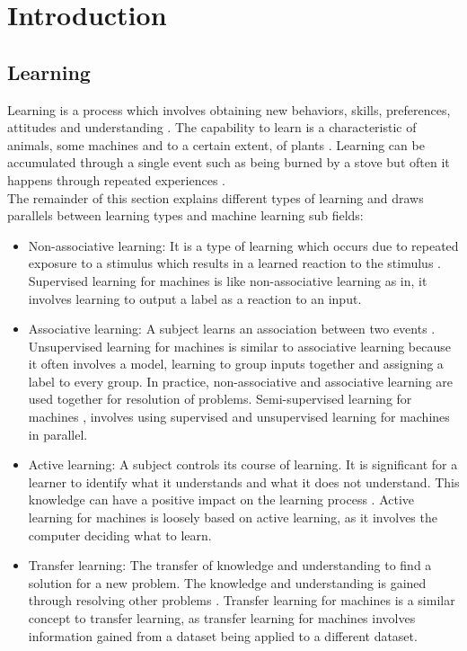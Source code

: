 
\chapter{Introduction}\label{chapter:introduction}

\section{Learning}
Learning is a process which involves obtaining new behaviors, skills, preferences, attitudes and understanding \cite{holt2012}. The capability to learn is a characteristic of animals, some machines and to a certain extent, of plants \cite{karban2015}. Learning can be accumulated through a single event such as being burned by a stove but often it happens through repeated experiences \cite{schacter2011}. \\
The remainder of this section explains different types of learning and draws parallels between learning types and machine learning sub fields:
\begin{itemize}
    \item Non-associative learning: It is a type of learning which occurs due to repeated exposure to a stimulus which results in a learned reaction to the stimulus \cite{fuentes2017}. Supervised learning for machines \cite{bishop2006} is like non-associative learning as in, it involves learning to output a label as a reaction to an input.
    \item Associative learning: A subject learns an association between two events \cite{plotnik2013}. Unsupervised learning for machines \cite{bishop2006} is similar to associative learning because it often involves a model, learning to group inputs together and assigning a label to every group. In practice, non-associative and associative learning are used together for resolution of problems. Semi-supervised learning for machines \cite{bishop2006}, involves using supervised and unsupervised learning for machines in parallel.
    \item Active learning: A subject controls its course of learning. It is significant for a learner to identify what it understands and what it does not understand. This knowledge can have a positive impact on the learning process \cite{scott2012}. Active learning for machines \cite{settles2009} is loosely based on active learning, as it involves the computer deciding what to learn.
    \item Transfer learning: The transfer of knowledge and understanding to find a solution for a new problem. The knowledge and understanding is gained through resolving other problems \cite{perkins1989}. Transfer learning for machines \cite{bishop2006} is a similar concept to transfer learning, as transfer learning for machines involves information gained from a dataset being applied to a different dataset.
\end{itemize}

